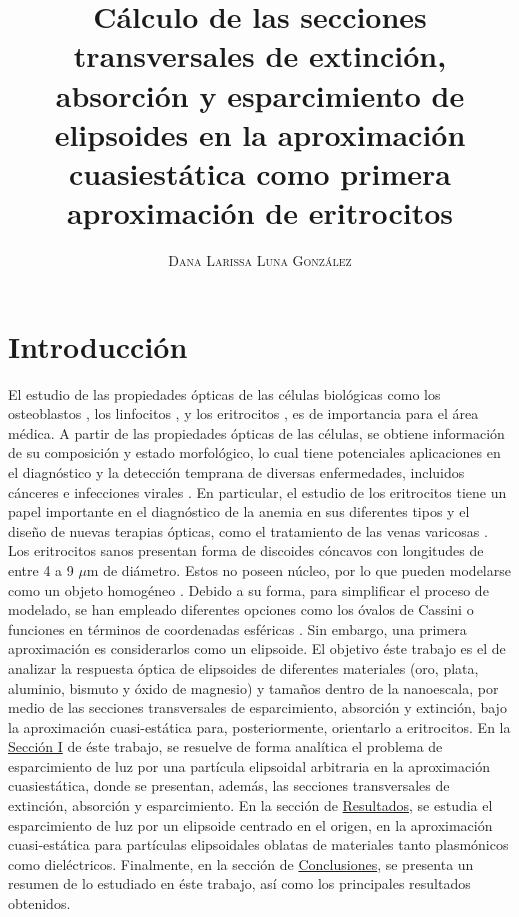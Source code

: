 \documentclass[paper=letter,11pt]{article}
\title{\vspace{-15mm}\fontsize{17pt}{1.25em}\selectfont\textbf{Cálculo de las secciones transversales de extinción, absorción y esparcimiento de elipsoides en la aproximación cuasiestática como primera aproximación de eritrocitos }} %
\author{
\large
{\textsc{ Dana Larissa Luna González}}\\[2mm]}
\date{}
\begin{document}
\maketitle %
\thispagestyle{fancy} %


\section{Introducción}
El estudio de las propiedades ópticas de las células biológicas como los osteoblastos \cite{Osteoblastos}, los linfocitos \cite{Linfocitos}, y los eritrocitos \cite{Blood}, es de importancia para el área médica. A partir de las propiedades ópticas de las células, se obtiene información de su composición y estado morfológico, lo cual tiene potenciales aplicaciones en el diagnóstico y la detección temprana de diversas enfermedades, incluidos cánceres e infecciones virales \cite{Linfocitos}. En particular, el estudio de los eritrocitos tiene un papel importante en el diagnóstico de la anemia en sus diferentes tipos y el diseño de nuevas terapias ópticas, como el tratamiento de las venas varicosas \cite{Blood}. \\

Los eritrocitos sanos presentan forma de discoides cóncavos con longitudes de entre 4 a 9 $\mu$m de diámetro. Estos no poseen núcleo, por lo que pueden modelarse como un objeto homogéneo \cite{Cassini}. Debido a su forma, para simplificar el proceso de modelado, se han empleado diferentes opciones como los óvalos de Cassini \cite{Cassini} o funciones en términos de coordenadas esféricas \cite{Esferico}. Sin embargo, una primera aproximación es considerarlos como un elipsoide. El objetivo éste trabajo es el de analizar la respuesta óptica de elipsoides de diferentes materiales (oro, plata, aluminio, bismuto y óxido de magnesio) y tamaños dentro de la nanoescala, por medio de las secciones transversales de esparcimiento, absorción y extinción, bajo la aproximación cuasi-estática para, posteriormente, orientarlo a eritrocitos. En la \hyperlink{primera}{Sección I} de éste trabajo, se resuelve de forma analítica el problema de esparcimiento de luz por una partícula elipsoidal arbitraria en la aproximación cuasiestática, donde se presentan, además, las secciones transversales de extinción, absorción y esparcimiento. En la sección de \hyperlink{resultados}{Resultados}, se estudia el esparcimiento de luz por un elipsoide centrado en el origen, en la aproximación cuasi-estática para partículas elipsoidales oblatas de materiales tanto plasmónicos como dieléctricos. Finalmente, en la sección de \hyperlink{conclusiones}{Conclusiones}, se presenta un resumen de lo estudiado en éste trabajo, así como los principales resultados obtenidos.











\printbibliography



\end{document}
